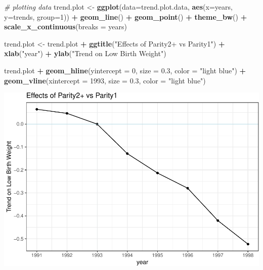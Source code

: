 \documentclass[
]{article}
\newenvironment{Shaded}{\begin{snugshade}}{\end{snugshade}}
\newcommand{\CommentTok}[1]{\textcolor[rgb]{0.56,0.35,0.01}{\textit{#1}}}
\newcommand{\DataTypeTok}[1]{\textcolor[rgb]{0.13,0.29,0.53}{#1}}
\newcommand{\DecValTok}[1]{\textcolor[rgb]{0.00,0.00,0.81}{#1}}
\newcommand{\FloatTok}[1]{\textcolor[rgb]{0.00,0.00,0.81}{#1}}
\newcommand{\KeywordTok}[1]{\textcolor[rgb]{0.13,0.29,0.53}{\textbf{#1}}}
\newcommand{\NormalTok}[1]{#1}
\newcommand{\OperatorTok}[1]{\textcolor[rgb]{0.81,0.36,0.00}{\textbf{#1}}}
\newcommand{\StringTok}[1]{\textcolor[rgb]{0.31,0.60,0.02}{#1}}
\begin{document}
\begin{Shaded}
\begin{Highlighting}[]
\CommentTok{# plotting data}
\NormalTok{trend.plot <-}\StringTok{ }\KeywordTok{ggplot}\NormalTok{(}\DataTypeTok{data=}\NormalTok{trend.plot.data, }
                     \KeywordTok{aes}\NormalTok{(}\DataTypeTok{x=}\NormalTok{years, }\DataTypeTok{y=}\NormalTok{trends, }\DataTypeTok{group=}\DecValTok{1}\NormalTok{)) }\OperatorTok{+}\StringTok{ }
\StringTok{  }\KeywordTok{geom_line}\NormalTok{() }\OperatorTok{+}
\StringTok{  }\KeywordTok{geom_point}\NormalTok{() }\OperatorTok{+}
\StringTok{  }\KeywordTok{theme_bw}\NormalTok{() }\OperatorTok{+}
\StringTok{  }\KeywordTok{scale_x_continuous}\NormalTok{(}\DataTypeTok{breaks =}\NormalTok{ years)}


\NormalTok{trend.plot <-}\StringTok{ }\NormalTok{trend.plot }\OperatorTok{+}\StringTok{ }\KeywordTok{ggtitle}\NormalTok{(}\StringTok{"Effects of Parity2+ vs Parity1"}\NormalTok{) }\OperatorTok{+}
\StringTok{  }\KeywordTok{xlab}\NormalTok{(}\StringTok{"year"}\NormalTok{) }\OperatorTok{+}
\StringTok{  }\KeywordTok{ylab}\NormalTok{(}\StringTok{"Trend on Low Birth Weight"}\NormalTok{) }

\NormalTok{trend.plot }\OperatorTok{+}\StringTok{  }
\StringTok{  }\KeywordTok{geom_hline}\NormalTok{(}\DataTypeTok{yintercept =} \DecValTok{0}\NormalTok{, }\DataTypeTok{size =} \FloatTok{0.3}\NormalTok{, }\DataTypeTok{color =} \StringTok{"light blue"}\NormalTok{) }\OperatorTok{+}
\StringTok{  }\KeywordTok{geom_vline}\NormalTok{(}\DataTypeTok{xintercept =} \DecValTok{1993}\NormalTok{, }\DataTypeTok{size =} \FloatTok{0.3}\NormalTok{, }\DataTypeTok{color =} \StringTok{"light blue"}\NormalTok{)}
\end{Highlighting}
\end{Shaded}

\includegraphics{Pset3_files/figure-latex/unnamed-chunk-19-1.pdf}
\newpage   \break
\end{document}

